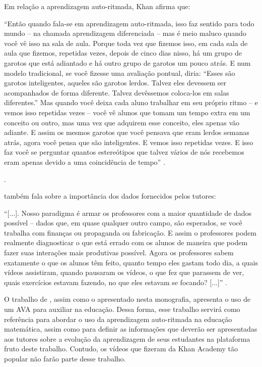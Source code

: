 Em relação a aprendizagem auto-ritmada, Khan afirma que:
\begin{citacao}
``Então quando fala-se em aprendizagem auto-ritmada, isso faz sentido para todo mundo – na chamada aprendizagem diferenciada – mas é meio maluco quando você vê isso na sala de aula. Porque toda vez 
que fizemos isso, em cada sala de aula que fizemos, repetidas vezes, depois de cinco dias nisso, há um grupo de garotos que está adiantado e há outro grupo de garotos um pouco atrás. E num modelo 
tradicional, se você fizesse uma avaliação pontual, diria: ``Esses são garotos inteligentes, aqueles são garotos lerdos. Talvez eles devessem ser acompanhados de forma diferente. Talvez devêssemos 
coloca-los em salas diferentes.'' Mas quando você deixa cada aluno trabalhar em seu próprio ritmo – e vemos isso repetidas vezes – você vê alunos que tomam um tempo extra em um conceito ou outro, mas 
uma vez que adquirem esse conceito, eles apenas vão adiante. E assim os mesmos garotos que você pensava que eram lerdos semanas atrás, agora você pensa que são inteligentes. E vemos isso repetidas 
vezes. E isso faz você se perguntar quantos estereótipos que talvez vários de nós recebemos eram apenas devido a uma coincidência de tempo'' \cite[13:29, Tradu\c{c}\~ao 
Livre]{tedtalk2011reinvend}.
\end{citacao}.


 também fala sobre a importância dos dados fornecidos pelos tutores:
\begin{citacao}
``[...]. Nosso paradigma é armar os professores com a maior quantidade de dados possível – dados que, em quase qualquer outro campo, são esperados, se você trabalha com finanças ou propaganda ou 
fabricação. E assim o professores podem realmente diagnosticar o que está errado com os alunos de maneira que podem fazer suas interações mais produtivas possível. Agora os professores sabem 
exatamente o que os alunos têm feito, quanto tempo eles gastam todo dia, a quais vídeos assistiram, quando pausaram os vídeos, o que fez que parassem de ver, quais exercícios estavam fazendo, no que 
eles estavam se focando? [...]'' \cite[12:26, Tradu\c{c}\~ao Livre]{tedtalk2011reinvend}.
\end{citacao}

O trabalho de , assim como o apresentado nesta monografia, apresenta o uso de um AVA para auxiliar na educação. Dessa forma, esse trabalho servirá como referência para abordar 
o uso da aprendizagem auto-ritmada na educação matemática, assim como para definir as informações que deverão ser apresentadas aos tutores sobre a evolução da aprendizagem de seus estudantes na 
plataforma fruto deste trabalho. Contudo, os vídeos que fizeram da Khan Academy tão popular não farão parte desse trabalho.

